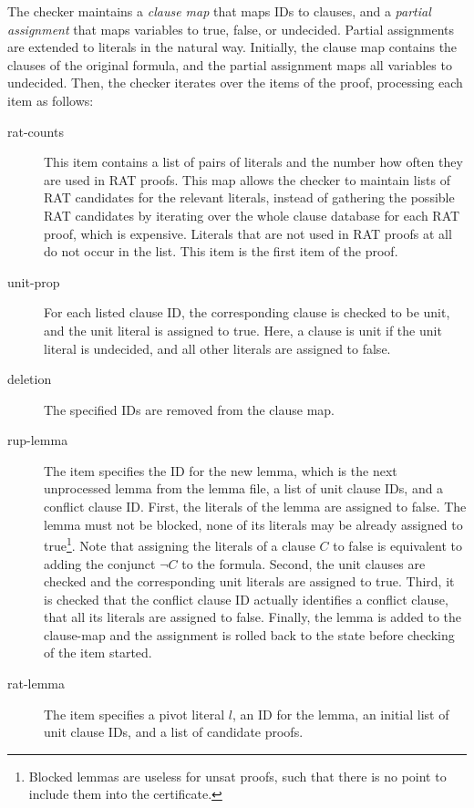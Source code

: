 \documentclass[smallcondensed]{svjour3}     %
\begin{document}
The checker maintains a \emph{clause map} that maps IDs to clauses, and a \emph{partial assignment} that maps variables to true, false, or undecided. 
Partial assignments are extended to literals in the natural way.
Initially, the clause map contains the clauses of the original formula, and the partial assignment maps all variables to undecided.
Then, the checker iterates over the items of the proof, processing each item as follows:
\begin{description}
    \item[rat-counts] This item contains a list of pairs of literals and the number how often they are used in RAT proofs. 
      This map allows the checker to maintain lists of RAT candidates for the relevant literals, instead of gathering the 
      possible RAT candidates by iterating over the whole clause database for each RAT proof, which is expensive.
      Literals that are not used in RAT proofs at all do not occur in the list. This item is the first item of the proof.
  \item[unit-prop] 
    For each listed clause ID, the corresponding clause is checked to be unit, and the unit literal is assigned to true.
    Here, a clause is unit if the unit literal is undecided, and all other literals are assigned to false.
  \item[deletion] The specified IDs are removed from the clause map.
  \item[rup-lemma] The item specifies the ID for the new lemma, which is the next unprocessed lemma from the lemma file, a list of unit clause IDs, and a conflict clause ID.
      First, the literals of the lemma are assigned to false. The lemma must not be blocked, \ie none of its literals may be already assigned to true\footnote{Blocked lemmas are useless for unsat proofs, such that there is no point to include them into the certificate.}.
        Note that assigning the literals of a clause $C$ to false is equivalent to adding the conjunct $\neg C$ to the formula. 
      Second, the unit clauses are checked and the corresponding unit literals are assigned to true.
      Third, it is checked that the conflict clause ID actually identifies a conflict clause, \ie that all its literals are assigned to false.
      Finally, the lemma is added to the clause-map and the assignment is rolled back to the state before checking of the item started.
    \item[rat-lemma] The item specifies a pivot literal $l$, an ID for the lemma, an initial list of unit clause IDs, and a list of
      candidate proofs. 

\end{description}
\end{document}
